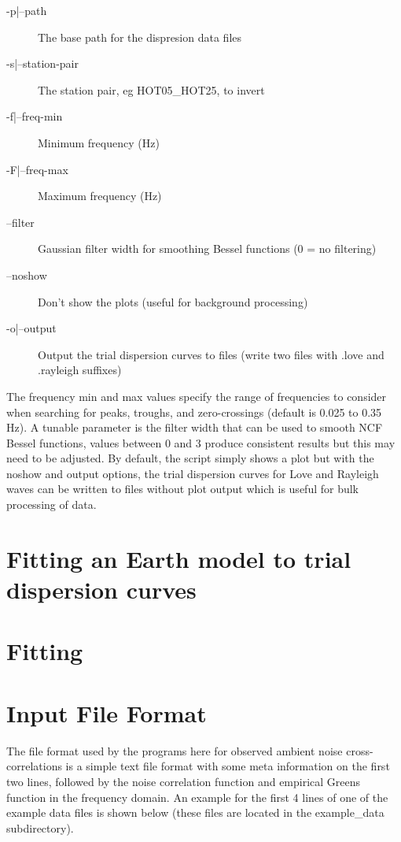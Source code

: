 \documentclass{article}
\begin{document}
\begin{description}
\item[-p|--path] The base path for the dispresion data files
\item[-s|--station-pair] The station pair, eg HOT05\_HOT25, to invert
\item[-f|--freq-min] Minimum frequency (Hz)
\item[-F|--freq-max] Maximum frequency (Hz)
\item[--filter] Gaussian filter width for smoothing Bessel functions (0 = no filtering)
\item[--noshow] Don't show the plots (useful for background processing)
\item[-o|--output] Output the trial dispersion curves to files (write two files with .love and .rayleigh suffixes)
\end{description}

The frequency min and max values specify the range of frequencies to
consider when searching for peaks, troughs, and zero-crossings
(default is 0.025 to 0.35 Hz). A tunable parameter is the filter width
that can be used to smooth NCF Bessel functions, values between 0 and
3 produce consistent results but this may need to be adjusted. By
default, the script simply shows a plot but with the noshow and output
options, the trial dispersion curves for Love and Rayleigh waves can
be written to files without plot output which is useful for bulk
processing of data.

\section{Fitting an Earth model to trial dispersion curves}



\section{Fitting}

  \appendix
  
\section{Input File Format}

The file format used by the programs here for observed ambient noise
cross-correlations is a simple text file format with some meta
information on the first two lines, followed by the noise correlation
function and empirical Greens function in the frequency domain.  An
example for the first 4 lines of one of the example data files is
shown below (these files are located in the example\_data
subdirectory).
\end{document}
